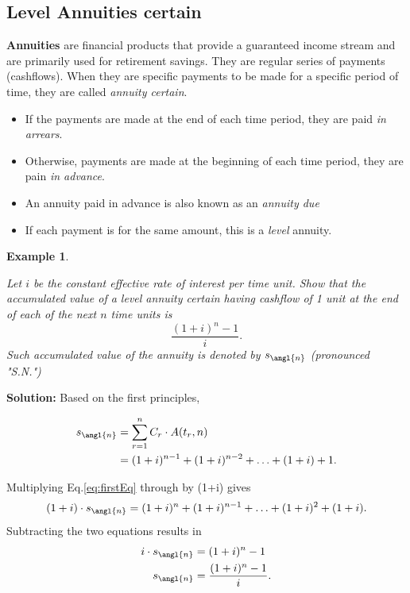 \documentclass[landscape, 20pt]{extreport}
\theoremstyle{definition}
\theoremstyle{definition}
\newtheorem{example}{Example}[chapter]
\theoremstyle{definition}
\theoremstyle{definition}
\theoremstyle{remark}
\begin{document}
\hypertarget{level-annuities-certain}{%
\subsection{Level Annuities certain}\label{level-annuities-certain}}

\textbf{Annuities} are financial products that provide a guaranteed income
stream and are primarily used for retirement savings. They are regular
series of payments (cashflows). When they are specific payments to be
made for a specific period of time, they are called \emph{annuity certain}.

\begin{itemize}
\item
  If the payments are made at the end of each time period, they are
  paid \emph{in arrears}.
\item
  Otherwise, payments are made at the beginning of each time period,
  they are pain \emph{in advance}.
\item
  An annuity paid in advance is also known as an \emph{annuity due}
\item
  If each payment is for the same amount, this is a \emph{level} annuity.
\end{itemize}

\newpage \begin{example}
\protect\hypertarget{exm:unlabeled-div-18}{}\label{exm:unlabeled-div-18}

\emph{Let \(i\) be the constant effective rate of interest
per time unit. Show that the accumulated value of a level annuity
certain having cashflow of 1 unit at the end of each of the next \(n\)
time units is \[\frac{(1+i)^n -1 }{i}.\] Such accumulated value of the
annuity is denoted by \(s_\angl{n}\) (pronounced "S.N.")}

\end{example}

\textbf{Solution:} Based on the first principles,

\begin{align} 
 s_\angl{n} &= \sum_{r=1}^n C_r \cdot A(t_r,n) \\
    &= (1+i)^{n-1} + (1+i)^{n-2} + \ldots + (1+i) + 1. \label{eq:firstEq} 
\end{align}

Multiplying Eq.\eqref{eq:firstEq}
through by (1+i) gives
\begin{equation}
    (1+i) \cdot s_\angl{n}  = (1+i)^{n} + (1+i)^{n-1} + \ldots + (1+i)^2 + (1+i). 
\end{equation} Subtracting the two equations results in
\[\begin{aligned}
    i \cdot s_\angl{n} &= (1+i)^{n} - 1\\
        s_\angl{n} &= \frac{(1+i)^{n} - 1}{i}.\end{aligned}\]
\end{document}
